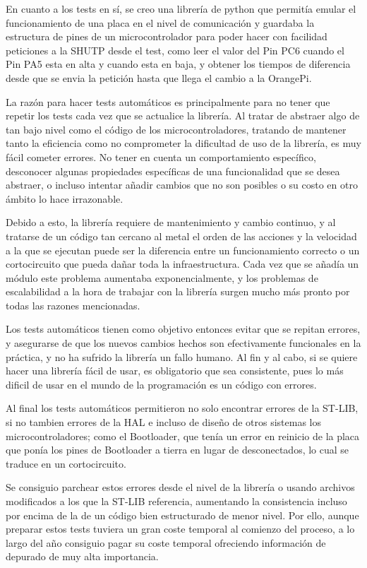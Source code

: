 \documentclass{report}
\begin{document}
\par \vspace{0.3cm}
En cuanto a los tests en sí, se creo una librería de python que permitía emular el funcionamiento de una placa en el nivel de comunicación y guardaba la estructura de pines de un microcontrolador para poder hacer con facilidad peticiones a la SHUTP desde el test, como leer el valor del Pin PC6 cuando el Pin PA5 esta en alta y cuando esta en baja, y obtener los tiempos de diferencia desde que se envia la petición hasta que llega el cambio a la OrangePi. 
\par \vspace{0.3cm}
La razón para hacer tests automáticos es principalmente para no tener que repetir los tests cada vez que se actualice la librería. Al tratar de abstraer algo de tan bajo nivel como el código de los microcontroladores, tratando de mantener tanto la eficiencia como no comprometer la dificultad de uso de la librería, es muy fácil cometer errores. No tener en cuenta un comportamiento específico, desconocer algunas propiedades específicas de una funcionalidad que se desea abstraer, o incluso intentar añadir cambios que no son posibles o su costo en otro ámbito lo hace irrazonable. 
\par
Debido a esto, la librería requiere de mantenimiento y cambio continuo, y al tratarse de un código tan cercano al metal el orden de las acciones y la velocidad a la que se ejecutan puede ser la diferencia entre un funcionamiento correcto o un cortocircuito que pueda dañar toda la infraestructura. Cada vez que se añadía un módulo este problema aumentaba exponencialmente, y los problemas de escalabilidad a la hora de trabajar con la librería surgen mucho más pronto por todas las razones mencionadas. 
\par \vspace{0.3cm}
Los tests automáticos tienen como objetivo entonces evitar que se repitan errores, y asegurarse de que los nuevos cambios hechos son efectivamente funcionales en la práctica, y no ha sufrido la librería un fallo humano. Al fin y al cabo, si se quiere hacer una librería fácil de usar, es obligatorio que sea consistente, pues lo más dificil de usar en el mundo de la programación es un código con errores. 
\par
Al final los tests automáticos permitieron no solo encontrar errores de la ST-LIB, si no tambien errores de la HAL e incluso de diseño de otros sistemas los microcontroladores; como el Bootloader, que tenía un error en reinicio de la placa que ponía los pines de Bootloader a tierra en lugar de desconectados, lo cual se traduce en un cortocircuito.
\par 
Se consiguio parchear estos errores desde el nivel de la librería o usando archivos modificados a los que la ST-LIB referencia, aumentando la consistencia incluso por encima de la de un código bien estructurado de menor nivel. Por ello, aunque preparar estos tests tuviera un gran coste temporal al comienzo del proceso, a lo largo del año consiguio pagar su coste temporal ofreciendo información de depurado de muy alta importancia. 
\newpage
\end{document}
